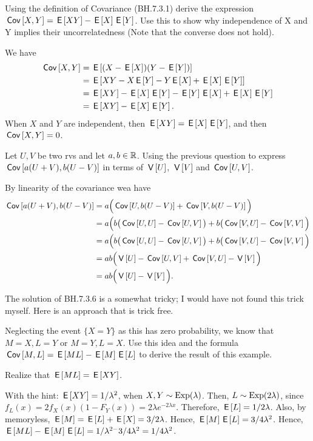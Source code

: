 \begin{exercise}
Using the definition of Covariance (BH.7.3.1) derive the expression $\cov{X,Y}=\E{XY}-\E{X}\E{Y}$. Use this to show why independence of X and Y implies their uncorrelatedness (Note that the converse does not hold).
\begin{solution}
We have
\begin{align}
    \cov{X,Y} &= \E{(X - \E{X})(Y - \E{Y})} \\
    &= \E{XY - X\E{Y} - Y\E{X} + \E{X}\E{Y}} \\
    &= \E{XY} - \E{X}\E{Y} - \E{Y} \E{X} + \E{X}\E{Y}\\
    &= \E{XY}-\E{X}\E{Y}.
\end{align}
When $X$ and $Y$ are independent, then $\E{XY} = \E X \E Y$, and then $\cov{X,Y}=0$.
\end{solution}
\end{exercise}

\begin{exercise}
Let $U, V$ be two rvs and let $a,b\in \R$.
Using the previous question to express $\cov{a(U+V), b(U-V)}$ in terms of $\V{U}$, $\V{V}$ and $\cov{U,V}$.
\begin{solution}
By linearity of the covariance wea have
\begin{align}
    \cov{a(U+V), b(U-V)} &= a \Big( \cov{U, b(U-V)} + \cov{V, b(U-V)} \Big) \\
    &= a \Big( b\big( \cov{U, U} - \cov{U, V} \big)  + b\big( \cov{V, U} - \cov{V,V} \Big) \\
    &= a \Big( b\big( \cov{U, U} - \cov{U, V} \big)  + b\big( \cov{V, U} - \cov{V,V} \Big) \\
    &= a b \Big( \V{U} - \cov{U, V} + \cov{V, U} - \V{V} \Big) \\
    &= a b \Big( \V{U} - \V{V} \Big).
\end{align}
\end{solution}
\end{exercise}


\begin{exercise}\label{ex:3a}
The solution of BH.7.3.6 is a somewhat tricky; I would have not  found this trick myself. Here is an approach that is trick free.

Neglecting the event $\{X=Y\}$ as this has zero probability, we know that $M=X, L=Y$ or $M=Y, L=X$. Use this idea and the formula $\cov{M,L} = \E{ML} - \E M \E L$ to derive the result of this example.
\begin{hint}
Realize that $\E{ML} = \E{XY}$.
\end{hint}
\begin{solution}
With the hint: $\E{XY}=1/\lambda^{2}$, when $X, Y \sim\Exp{\lambda}$. Then, $L\sim \Exp{2\lambda}$, since $f_{L}(x) = 2 f_X(x) (1-F_Y(x)) = 2 \lambda e^{-2\lambda x}$. Therefore, $\E L = 1/2\lambda$. Also, by memoryless, $\E{M} = \E L + \E X = 3/2\lambda$. Hence, $\E{M}\E L = 3/4\lambda^{2}$. Hence, $\E{ML}- \E M \E L = 1/\lambda^{2-} 3/4\lambda^2 = 1/4\lambda^{2}$.
\end{solution}
\end{exercise}


